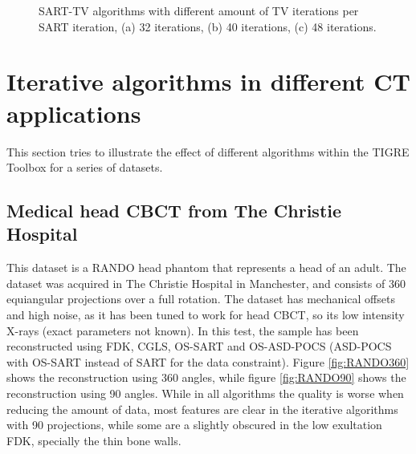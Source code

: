 \begin{figure}
\centering
{}
\caption[SART-TV algorithms with different parameters]{\label{fig:SARTTVparams}SART-TV algorithms with different amount of TV iterations per SART iteration, (a) 32 iterations, (b) 40 iterations, (c) 48 iterations.}
\end{figure}



\FloatBarrier
\section{Iterative algorithms in different CT applications}
This section tries to illustrate the effect of different algorithms within the TIGRE Toolbox for a series of datasets. 
\subsection{Medical head CBCT from  The Christie Hospital}

This dataset is a RANDO head phantom that represents a head of an adult. The dataset was acquired in The Christie Hospital in Manchester, and consists of 360 equiangular projections over a full rotation. The dataset has mechanical offsets and high noise, as it has been tuned to work for head CBCT, so its low intensity X-rays (exact parameters not known). In this test, the sample has been reconstructed using FDK, CGLS, OS-SART and OS-ASD-POCS (ASD-POCS with OS-SART instead of SART for the data constraint). Figure \ref{fig:RANDO360} shows the reconstruction using 360 angles, while figure \ref{fig:RANDO90} shows the reconstruction using 90 angles. While in all algorithms the quality is worse when reducing the amount of data, most features are clear in the iterative algorithms with 90 projections, while some are a slightly obscured in the low exultation FDK, specially the thin bone walls.

